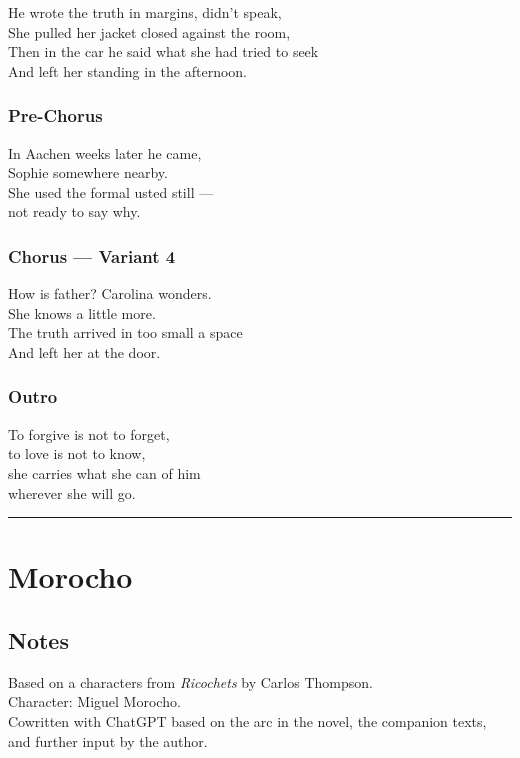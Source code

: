 He wrote the truth in margins, didn't speak,\\
She pulled her jacket closed against the room,\\
Then in the car he said what she had tried to seek\\
And left her standing in the afternoon.

\subsubsection{Pre-Chorus}\label{pre-chorus-21}

In Aachen weeks later he came,\\
Sophie somewhere nearby.\\
She used the formal usted still ---\\
not ready to say why.

\subsubsection{Chorus --- Variant 4}\label{chorus-variant-4}

How is father? Carolina wonders.\\
She knows a little more.\\
The truth arrived in too small a space\\
And left her at the door.

\subsubsection{Outro}\label{outro-3}

To forgive is not to forget,\\
to love is not to know,\\
she carries what she can of him\\
wherever she will go.

\begin{center}\rule{0.5\linewidth}{0.5pt}\end{center}

\section{Morocho}\label{morocho}

\subsection{Notes}\label{notes-19}

Based on a characters from \emph{Ricochets} by Carlos Thompson.\\
Character: Miguel Morocho.\\
Cowritten with ChatGPT based on the arc in the novel, the companion
texts, and further input by the author.

